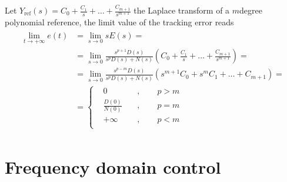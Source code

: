 \documentclass[letterpaper,10pt,english]{jupyterBook}
\begin{document}
\sphinxAtStartPar
Let \(Y_{\text{ref}}(s) = C_0 + \frac{C_1}{s} + \dots + \frac{C_{m+1}}{s^{m+1}}\) the Laplace transform of a \(m\)\sphinxhyphen{}degree polynomial reference, the limit value of the tracking error reads
\begin{equation*}
\begin{split}\begin{aligned}
  \lim_{t \rightarrow + \infty} e(t) 
  & = \lim_{s \rightarrow 0} s E(s) = \\
  & = \lim_{s \rightarrow 0} \frac{ s^{p+1} D(s) }{ s^p D(s) + N(s) } \left( C_0 + \frac{C_1}{s} + \dots + \frac{C_{m+1}}{s^{m+1}} \right) = \\
  & = \lim_{s \rightarrow 0} \frac{ s^{p-m} D(s) }{ s^p D(s) + N(s) } \left( s^{m+1}C_0 + s^m C_1 + \dots + C_{m+1} \right) = \\
  & = \left\{
  \begin{aligned}
    & 0                 && \ , \qquad p > m \\
    & \frac{D(0)}{N(0)} && \ , \qquad p = m \\
    & +\infty           && \ , \qquad p < m \\
  \end{aligned} \right.
\end{aligned}\end{split}
\end{equation*}
\sphinxAtStartPar
{}

\sphinxstepscope


\chapter{Frequency domain control}
\label{\detokenize{ch/control/frequency-domain:frequency-domain-control}}\label{\detokenize{ch/control/frequency-domain:control-frequency}}\label{\detokenize{ch/control/frequency-domain::doc}}
\end{document}
